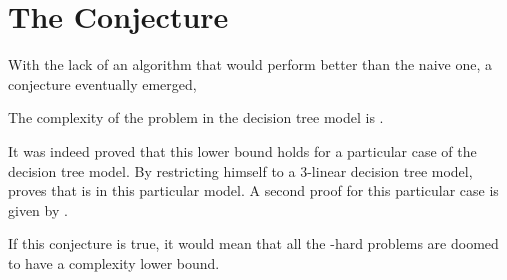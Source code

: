 \section{The Conjecture}

With the lack of an algorithm that would perform better than the naive
 one, a conjecture eventually emerged,

\begin{conjecture}
The complexity of the \threeSUM problem in the decision tree model is
.
\end{conjecture}

It was indeed proved that this lower bound holds for a particular case of the
decision tree model. By restricting himself to a $3$-linear decision tree
model, \citet{erickson:1999} proves that \threeSUM is  in this
particular model. A second proof for this particular case is given by
\citet{ailon:2005}.

If this conjecture is true, it would mean that all the \threeSUM-hard
problems are doomed to have a  complexity lower bound.
